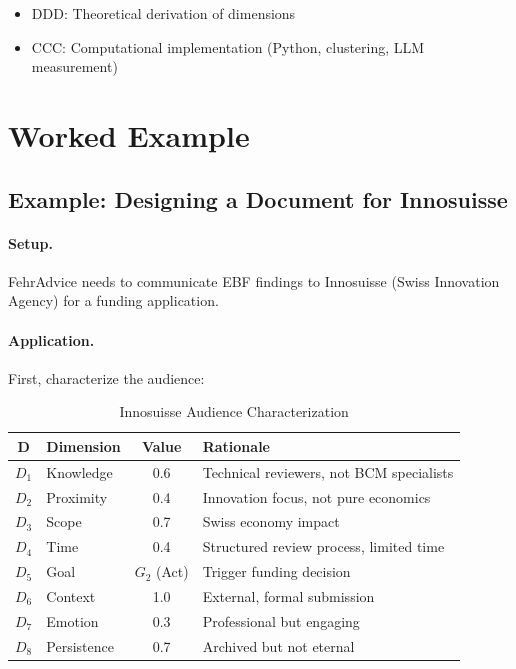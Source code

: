 \begin{itemize}[nosep]
\item DDD: Theoretical derivation of dimensions
\item CCC: Computational implementation (Python, clustering, LLM measurement)
\end{itemize}


\section{Worked Example}
\label{sec:doctype-theory-example}

\subsection{Example: Designing a Document for Innosuisse}

\paragraph{Setup.} FehrAdvice needs to communicate EBF findings to
Innosuisse (Swiss Innovation Agency) for a funding application.

\paragraph{Application.} First, characterize the audience:

\begin{table}[htbp]
\centering
\caption{Innosuisse Audience Characterization}
\renewcommand{\arraystretch}{1.3}
\begin{tabular}{@{}clcl@{}}
\toprule
\textbf{D} & \textbf{Dimension} & \textbf{Value} & \textbf{Rationale} \\
\midrule
$D_1$ & Knowledge & 0.6 & Technical reviewers, not BCM specialists \\
$D_2$ & Proximity & 0.4 & Innovation focus, not pure economics \\
$D_3$ & Scope & 0.7 & Swiss economy impact \\
$D_4$ & Time & 0.4 & Structured review process, limited time \\
$D_5$ & Goal & $G_2$ (Act) & Trigger funding decision \\
$D_6$ & Context & 1.0 & External, formal submission \\
$D_7$ & Emotion & 0.3 & Professional but engaging \\
$D_8$ & Persistence & 0.7 & Archived but not eternal \\
\bottomrule
\end{tabular}
\end{table}

